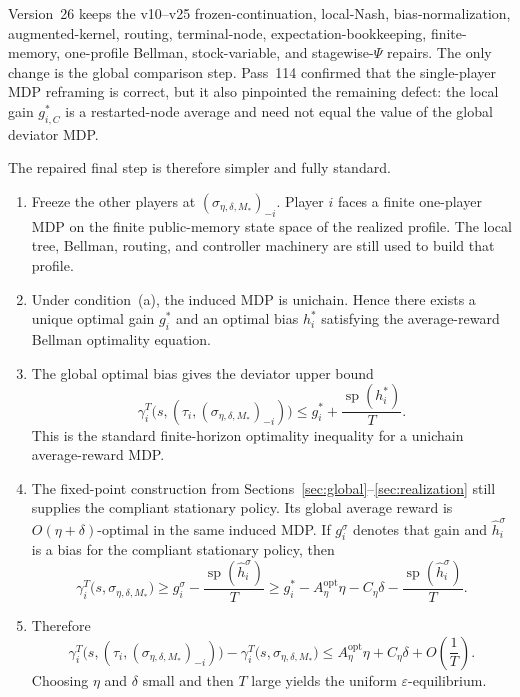 \documentclass[12pt]{article}
\theoremstyle{definition}
\newcommand{\eps}{\varepsilon}
\newcommand{\1}{\mathbf{1}}
\DeclareMathOperator{\spn}{sp}
\begin{document}
Version~26 keeps the v10--v25 frozen-continuation, local-Nash,
bias-normalization, augmented-kernel, routing, terminal-node,
expectation-bookkeeping, finite-memory, one-profile Bellman, stock-variable,
and stagewise-$\Psi$ repairs. The only change is the global comparison step.
Pass~114 confirmed that the single-player MDP reframing is correct, but it also
pinpointed the remaining defect: the local gain $g_{i,C}^*$ is a restarted-node
average and need not equal the value of the global deviator MDP.

The repaired final step is therefore simpler and fully standard.
\begin{enumerate}[label=\textnormal{(\arabic*)},leftmargin=2.4em]
\item Freeze the other players at $(\sigma_{\eta,\delta,M_*})_{-i}$. Player $i$
faces a finite one-player MDP on the finite public-memory state space of the
realized profile. The local tree, Bellman, routing, and controller machinery are
still used to build that profile.

\item Under condition~\textnormal{(a)}, the induced MDP is unichain. Hence there
exists a unique optimal gain $g_i^*$ and an optimal bias $h_i^*$ satisfying the
average-reward Bellman optimality equation.

\item The global optimal bias gives the deviator upper bound
\[
\gamma_i^T\bigl(s,(\tau_i,(\sigma_{\eta,\delta,M_*})_{-i})\bigr)
\le
 g_i^*+\frac{\spn(h_i^*)}{T}.
\]
This is the standard finite-horizon optimality inequality for a unichain
average-reward MDP.

\item The fixed-point construction from
Sections~\ref{sec:global}--\ref{sec:realization} still supplies the compliant
stationary policy. Its global average reward is $O(\eta+\delta)$-optimal in the
same induced MDP. If $g_i^{\sigma}$ denotes that gain and
$\widehat h_i^{\sigma}$ is a bias for the compliant stationary policy, then
\[
\gamma_i^T\bigl(s,\sigma_{\eta,\delta,M_*}\bigr)
\ge
 g_i^{\sigma}-\frac{\spn(\widehat h_i^{\sigma})}{T}
\ge
 g_i^* - A_\eta^{\mathrm{opt}}\eta - C_\eta\delta - \frac{\spn(\widehat h_i^{\sigma})}{T}.
\]

\item Therefore
\[
\gamma_i^T\bigl(s,(\tau_i,(\sigma_{\eta,\delta,M_*})_{-i})\bigr)
-
\gamma_i^T\bigl(s,\sigma_{\eta,\delta,M_*}\bigr)
\le
A_\eta^{\mathrm{opt}}\eta + C_\eta\delta + O\!\left(\frac1T\right).
\]
Choosing $\eta$ and $\delta$ small and then $T$ large yields the uniform
$\eps$-equilibrium.
\end{enumerate}
\end{document}
